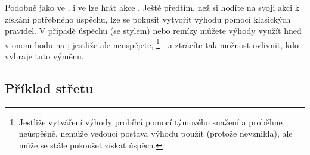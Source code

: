 Podobně jako ve , i ve  lze hrát akce . Ještě předtím, než si hodíte na svoji akci  k získání potřebného úspěchu, lze se pokusit vytvořit výhodu pomocí klasických pravidel. V případě úspěchu (se stylem) nebo remízy můžete výhody využít hned v onom hodu na ; jestliže ale neuspějete,  \footnote{Jestliže vytváření výhody probíhá pomocí týmového snažení a proběhne neúspěšně, nemůže vedoucí postava výhodu použít (protože nevznikla), ale může se stále pokoušet získat úspěch.} - a ztrácíte tak možnost ovlivnit, kdo vyhraje tuto výměnu.

\subsection{Příklad střetu}
\label{sec:příklad-střet}

